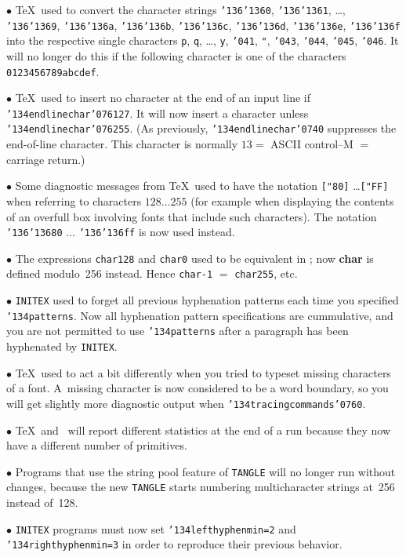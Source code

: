 \medskip $\bullet$\enspace
\TeX\ used to convert the character strings
{\tt{\char'136\char'136}0},
{\tt{\char'136\char'136}1},
\dots,
{\tt{\char'136\char'136}9},
{\tt{\char'136\char'136}a},
{\tt{\char'136\char'136}b},
{\tt{\char'136\char'136}c},
{\tt{\char'136\char'136}d},
{\tt{\char'136\char'136}e},
{\tt{\char'136\char'136}f}
into the respective single characters
{\tt p},
{\tt q},
\dots,
{\tt y},
{\tt{\char'041}},
{\tt "},
{\tt{\char'043}},
{\tt{\char'044}},
{\tt{\char'045}},
{\tt{\char'046}}.
It will no longer do this if the following character is one of the characters
{\tt 0123456789abcdef}.

\medskip $\bullet$\enspace
\TeX\ used to insert no character at the end of an input line if
{\tt{\char'134}endlinechar{\char'076}127}.
It will now insert a character unless
{\tt{\char'134}endlinechar{\char'076}255}.
(As previously,
{\tt{\char'134}endlinechar{\char'074}0}
suppresses the end-of-line character. This character is normally
$13=$ ASCII control--M $=$ carriage return.)

\medskip $\bullet$\enspace
Some diagnostic messages from \TeX\ used to have the notation
{\tt ["80]} \dots {\tt ["FF]}
when referring to characters $128\ldots 255$ (for example when displaying the
contents of an overfull box involving fonts that include such characters).
The notation
{\tt{\char'136\char'136}80} $\ldots$ 
{\tt{\char'136\char'136}ff}
is now used instead.

\medskip $\bullet$\enspace
The expressions
{\tt{char128}} and {\tt{char0}} used to be equivalent in \MF; now
{\bf char} is defined modulo~256 instead. Hence {\tt{char-1}} $=$
{\tt{char255}}, etc.

\medskip $\bullet$\enspace
{\tt INITEX} used to forget all previous hyphenation patterns each time
you specified
{\tt{\char'134}patterns}.
Now all hyphenation pattern specifications are cummulative, and you are not
permitted to use
{\tt{\char'134}patterns}
after a paragraph has been hyphenated by {\tt INITEX}.

\medskip $\bullet$\enspace
\TeX\ used to act a bit differently when you tried to typeset missing
characters of a font. A~missing character is now considered to be a word
boundary, so you will get slightly more diagnostic output when
{\tt{\char'134}tracingcommands{\char'076}0}.

\medskip $\bullet$\enspace
\TeX\ and \MF\ will report different statistics at the end of a run because
they now have a different number of primitives.

\medskip $\bullet$\enspace
Programs that use the string pool feature of {\tt TANGLE} will no longer run
without changes, because the new {\tt TANGLE} starts numbering multicharacter
strings at~256 instead of~128.

\medskip $\bullet$\enspace
{\tt INITEX} programs must now set
{\tt{\char'134}lefthyphenmin=2} and
{\tt{\char'134}righthyphenmin=3}
in order to reproduce their previous behavior.






